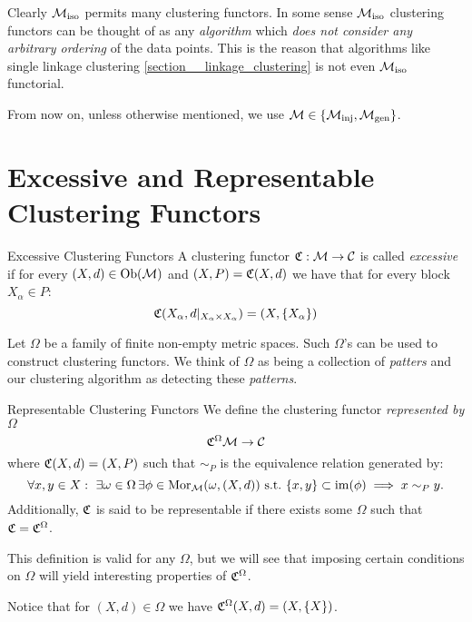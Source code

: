 Clearly ${\mathcal{M}_\mathrm{iso}}$ permits many clustering functors.
In some sense ${\mathcal{M}_\mathrm{iso}}$ clustering functors can be thought of as any \emph{algorithm} which \emph{does not consider any arbitrary ordering} of the data points.
This is the reason that algorithms like single linkage clustering \ref{section__linkage_clustering} is not even ${\mathcal{M}_\mathrm{iso}}$ functorial.

From now on, unless otherwise mentioned, we use $\mathcal{M} \in \{{\mathcal{M}_\mathrm{inj}}, {\mathcal{M}_\mathrm{gen}}\}$.

\section{Excessive and Representable Clustering Functors}
\begin{definition}{Excessive Clustering Functors \cite{Carlsson2010}}{}
A clustering functor $\mathfrak{C}: \mathcal{M} \to \mathcal{C}$ is called \emph{excessive} if for every $(X,d) \in \mathrm {Ob}(\mathcal{M})$ and $(X,P) = \mathfrak{C}(X,d)$ we have that for every block $X_\alpha \in P$:
$$
\mathfrak{C}(X_\alpha, d|_{X_\alpha \times X_\alpha}) = (X, \{X_\alpha\})
$$
\end{definition}

Let $\Omega$ be a family of finite non-empty metric spaces. Such $\Omega$'s can be used to construct clustering functors. We think of $\Omega$ as being a collection of \emph{patters} and our clustering algorithm as detecting these \emph{patterns}.



\begin{definition}{Representable Clustering Functors \cite{Carlsson2010}}{}
We define the clustering functor \emph{represented by $\Omega$}
$$
\mathfrak{C}^\Omega \mathcal{M} \to \mathcal{C}
$$
where $\mathfrak{C}(X,d) = (X, P)$ such that $\sim_P$ 
is the equivalence relation generated by:
\begin{equation*}
    \forall x,y \in X: \ \exists \omega \in \Omega \,\exists \phi \in \mathrm {Mor}_{\mathcal{M}}(\omega, (X,d)) \ \text{s.t.} \ \{x,y\} \subset \operatorname*{im}(\phi) \implies x \sim_P y.
\end{equation*}
Additionally, $\mathfrak{C}$ is said to be representable if there exists some $\Omega$ such that $\mathfrak{C} = \mathfrak{C}^\Omega$.
\end{definition}

This definition is valid for any $\Omega$, but we will see that imposing certain conditions on $\Omega$ will yield interesting properties of $\mathfrak{C}^\Omega$.

\begin{myremark}{}{}
Notice that for $(X,d) \in \Omega$ we have $\mathfrak{C}^\Omega(X,d) = (X, \{X\})$.
\end{myremark}

